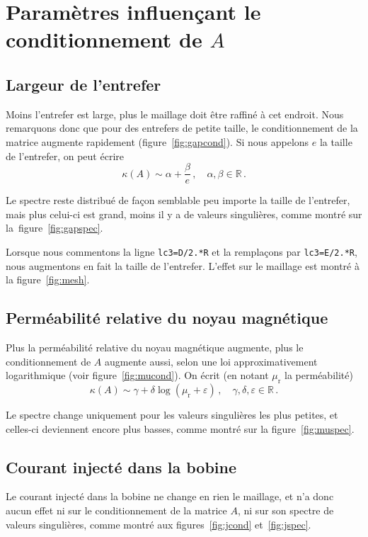 \documentclass[11pt]{article}
\begin{document}
\section{Paramètres influençant le conditionnement de $A$}
\label{param}
\subsection{Largeur de l'entrefer}
Moins l'entrefer est large, plus le maillage doit être raffiné à cet endroit.
Nous remarquons donc que pour des entrefers de petite taille,
le conditionnement de la matrice augmente rapidement (figure~\ref{fig:gapcond}).
Si nous appelons $e$ la taille de l'entrefer, on peut écrire
\[
\kappa(A) \sim \alpha + \frac{\beta}{e}\,, \quad \alpha, \beta \in \mathbb{R}\,.
\]

Le spectre reste distribué de façon semblable peu importe la taille de l'entrefer,
mais plus celui-ci est grand, moins il y a de valeurs singulières, comme montré sur la figure~\ref{fig:gapspec}.

Lorsque nous commentons la ligne \texttt{lc3=D/2.*R} et la remplaçons par \texttt{lc3=E/2.*R}, nous augmentons en fait la taille de l'entrefer.
L'effet sur le maillage est montré à la figure~\ref{fig:mesh}.

\subsection{Perméabilité relative du noyau magnétique}
Plus la perméabilité relative du noyau magnétique augmente,
plus le conditionnement de $A$ augmente aussi, selon une loi approximativement logarithmique (voir figure~\ref{fig:mucond}). On écrit (en notant $\mu_{\mathrm{r}}$ la perméabilité)
\[
\kappa(A) \sim \gamma + \delta \log(\mu_{\mathrm{r}} + \varepsilon)\,, \quad \gamma, \delta, \varepsilon \in \mathbb{R}\,. 
\]

Le spectre change uniquement pour les valeurs singulières les plus petites,
et celles-ci deviennent encore plus basses, comme montré sur la figure~\ref{fig:muspec}.

\subsection{Courant injecté dans la bobine}
Le courant injecté dans la bobine ne change en rien le maillage,
et n'a donc aucun effet ni sur le conditionnement de la matrice $A$,
ni sur son spectre de valeurs singulières,
comme montré aux figures~\ref{fig:jcond} et~\ref{fig:jspec}.
\end{document}
